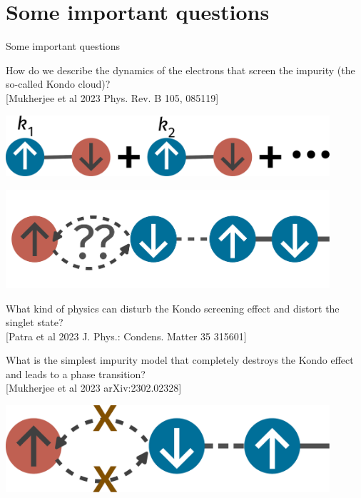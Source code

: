 \documentclass[10pt,aspectratio=169]{beamer}
\begin{document}
\section{Some important questions}
\begin{frame}{Some important questions}
\begin{minipage}{0.45\textwidth}
	How do we describe the dynamics of the electrons that screen the impurity (the so-called \alert{Kondo cloud})?\\
	\footnotesize{[Mukherjee et al 2023 Phys. Rev. B 105, 085119]}
\end{minipage}
\hspace*{\fill}
\begin{minipage}{0.45\textwidth}
	\includegraphics[width=0.9\textwidth]{kondocloud.pdf}
\end{minipage}
\vspace*{\fill}

\begin{minipage}{0.45\textwidth}
	\includegraphics[width=0.9\textwidth]{distortsinglet.pdf}
\end{minipage}
\hspace*{\fill}
\begin{minipage}{0.45\textwidth}
	What kind of physics can \alert{disturb the Kondo screening} effect and distort the singlet state?\\
	\footnotesize{[Patra et al 2023 J. Phys.: Condens. Matter 35 315601]}
\end{minipage}
\vspace*{\fill}

\begin{minipage}{0.45\textwidth}
	What is the simplest impurity model that completely destroys the Kondo effect and leads to a \alert{phase transition}?\\
	\footnotesize{[Mukherjee et al 2023 arXiv:2302.02328]}
\end{minipage}
\hspace*{\fill}
\begin{minipage}{0.45\textwidth}
	\includegraphics[width=0.9\textwidth]{kondobreakdown.pdf}
\end{minipage}
\end{frame}
\end{document}
